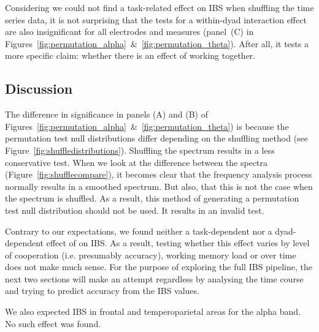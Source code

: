 Considering we could not find a task-related effect on IBS when shuffling the
time series data, it is not surprising that the tests for a within-dyad
interaction effect are also insignificant for all electrodes and measures
(panel~(C) in
Figures~\ref{fig:permutation_alpha}~\&~\ref{fig:permutation_theta}). After all,
it tests a more specific claim: whether there is an effect of working together.

\subsection{Discussion}

The difference in significance in panels (A) and (B) of
Figures~\ref{fig:permutation_alpha}~\&~\ref{fig:permutation_theta}) is because
the permutation test null distributions differ depending on the shuffling method
(see Figure~\ref{fig:shuffledistributions}). Shuffling the spectrum results in a
less conservative test. When we look at the difference between the spectra
(Figure~\ref{fig:shufflecompare}), it becomes clear that the frequency analysis
process normally results in a smoothed spectrum. But also, that this is not the
case when the spectrum is shuffled. As a result, this method of generating a
permutation test null distribution should not be used. It results in an invalid
test.

Contrary to our expectations, we found neither a task-dependent nor a
dyad-dependent effect of on IBS. As a result, testing whether this effect varies
by level of cooperation (i.e. presumably accuracy), working memory load or over
time does not make much sense. For the purpose of exploring the full IBS
pipeline, the next two sections will make an attempt regardless by analysing the
time course and trying to predict accuracy from the IBS values.

We also expected IBS in frontal and temperoparietal areas for the alpha band. No
such effect was found.
